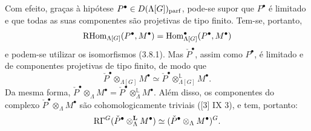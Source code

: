 Com efeito, graças à hipótese $P^\bullet\in D(\Lambda[G])_{\mathrm{parf}}$, pode-se supor que $P^\bullet$ é limitado e que todas as suas componentes são projetivas de tipo finito. Tem-se, portanto,
\[
\mathrm{RHom}_{\Lambda[G]}(P^\bullet,M^\bullet)=\operatorname{Hom}_{\Lambda[G]}^\bullet(P^\bullet,M^\bullet)
\]
e podem-se utilizar os isomorfismos (3.8.1). Mas $\check P^\bullet$, assim como $P^\bullet$, é limitado e de componentes projetivas de tipo finito, de modo que
\[
\check P^\bullet\otimes_{\Lambda[G]}M^\bullet\simeq \check P^\bullet\otimes_{\Lambda[G]}^{\mathbb L}M^\bullet.
\]
Da mesma forma, $\check P^\bullet\otimes_\Lambda M^\bullet=\check P^\bullet\otimes_\Lambda^{\mathbb L}M^\bullet$. Além disso, os componentes do complexo $\check P^\bullet\otimes_\Lambda M^\bullet$ são cohomologicamente triviais ([3] IX 3), e tem, portanto:
\[
\mathrm{R}\Gamma^G(\check P^\bullet\otimes_\Lambda^{\mathbf L}M^\bullet)\simeq (\check P^\bullet\otimes_\Lambda M^\bullet)^G.
\]
